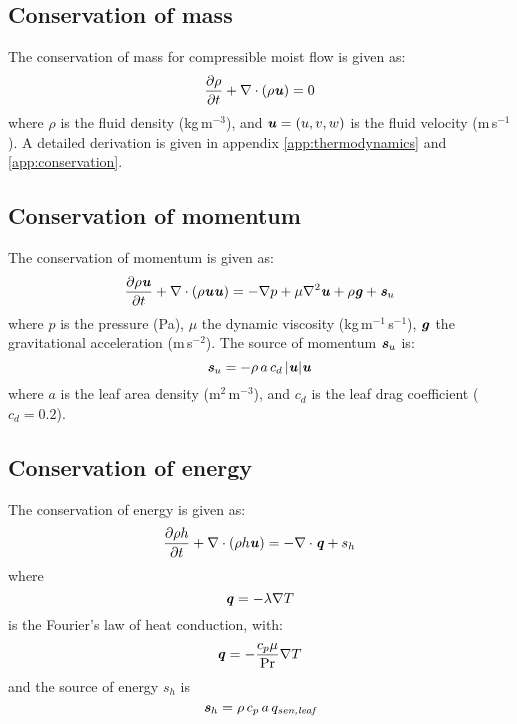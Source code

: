 \subsection*{Conservation of mass}

The conservation of mass for compressible moist flow is given as:
\begin{equation}
\frac{\partial \rho}{\partial t} + \nabla \cdot \left( \rho \textbf{\textit{u}} \right)= 0
\end{equation}
where $\rho$ is the fluid density (kg\,m$^{-3}$), and $\textbf{\textit{u}} = \left(u,v,w\right)$ is the fluid velocity (m\,s$^{-1}$). A detailed derivation is given in appendix \ref{app:thermodynamics} and \ref{app:conservation}.

\subsection*{Conservation of momentum}

The conservation of momentum is given as:
\begin{equation}
\frac{\partial \rho \textbf{\textit{u}}}{\partial t} + \nabla  \cdot \left( \rho \textbf{\textit{u}} \textbf{\textit{u}} \right) = -\nabla p + \mu \nabla^2 \textbf{\textit{u}} + \rho \textbf{\textit{g}} + \textbf{\textit{s}}_u
\end{equation}
where $p$ is the pressure (Pa), $\mu$ the dynamic viscosity (kg\,m$^{-1}$\,s$^{-1}$), $\textbf{\textit{g}}$ the gravitational acceleration (m\,s$^{-2}$). The source of momentum $\textbf{\textit{s}}_u$ is:
\begin{equation}
\textbf{\textit{s}}_u = - \rho\, a \,c_d \,|\textbf{\textit{u}}|\textbf{\textit{u}}
\end{equation}
where $a$ is the leaf area density (m$^2$\,m$^{-3}$), and $c_d$ is the leaf drag coefficient ($c_d = 0.2$).


\subsection*{Conservation of energy}

The conservation of energy is given as:
\begin{equation}
\frac{\partial \rho h}{\partial t} + \nabla  \cdot \left( \rho h \textbf{\textit{u}} \right) = -\nabla \cdot \textbf{\textit{q}} + s_h
\end{equation}
where 
\begin{equation}
\textbf{\textit{q}} = - \lambda \nabla T
\end{equation}
is the Fourier's law of heat conduction, with:
\begin{equation}
\textbf{\textit{q}} = - \frac{c_p \mu}{\mathrm{Pr}} \nabla T
\end{equation}
and the source of energy $s_h$ is 
\begin{equation}
\textbf{\textit{s}}_h = \rho\,c_p\, a\, q_{\textit{sen,leaf}}
\label{eq:sh}
\end{equation}

